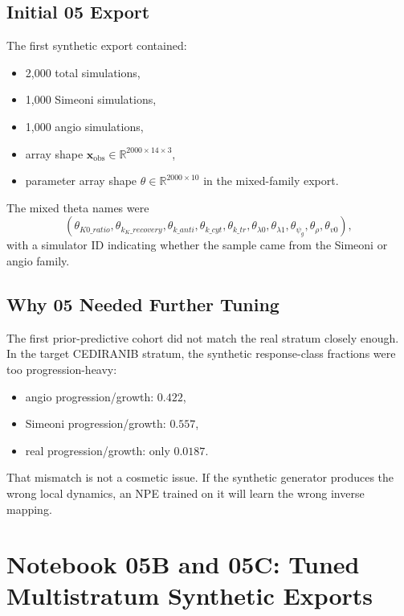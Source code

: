 \documentclass[11pt,a4paper]{article}
\newcommand{\R}{\mathbb{R}}
\newcommand{\xobs}{\mathbf{x}_{\mathrm{obs}}}
\begin{document}
\subsection{Initial 05 Export}

The first synthetic export contained:
\begin{itemize}[leftmargin=2em]
    \item 2,000 total simulations,
    \item 1,000 Simeoni simulations,
    \item 1,000 angio simulations,
    \item array shape $\xobs\in\R^{2000\times 14\times 3}$,
    \item parameter array shape $\theta\in\R^{2000\times 10}$ in the mixed-family export.
\end{itemize}

The mixed theta names were
\[
(\theta_{K0\_ratio},\theta_{k_K\_recovery},\theta_{k\_anti},\theta_{k\_cyt},\theta_{k\_tr},\theta_{\lambda0},\theta_{\lambda1},\theta_{\psi_g},\theta_{\rho},\theta_{v0}),
\]
with a simulator ID indicating whether the sample came from the Simeoni or angio family.

\subsection{Why 05 Needed Further Tuning}

The first prior-predictive cohort did not match the real stratum closely enough. In the target CEDIRANIB stratum, the synthetic response-class fractions were too progression-heavy:
\begin{itemize}[leftmargin=2em]
    \item angio progression/growth: $0.422$,
    \item Simeoni progression/growth: $0.557$,
    \item real progression/growth: only $0.0187$.
\end{itemize}

That mismatch is not a cosmetic issue. If the synthetic generator produces the wrong local dynamics, an NPE trained on it will learn the wrong inverse mapping.

\section{Notebook 05B and 05C: Tuned Multistratum Synthetic Exports}
\end{document}
